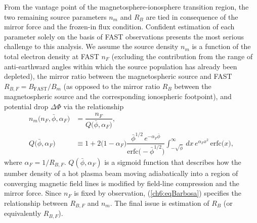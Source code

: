   From the vantage point of the magnetosphere-ionosphere transition region, the
  two remaining source parameters $n_m$ and $R_B$ are tied in consequence of
  the mirror force and the frozen-in flux condition. Confident estimation of
  each parameter solely on the basis of FAST observations presents the most
  serious challenge to this analysis. We assume the source density $n_m$ is a
  function of the total electron density at FAST $n_F$ (excluding the
  contribution from the range of anti-earthward angles within which the source
  population has already been depleted), the mirror ratio between the
  magnetospheric source and FAST $R_{B,F} = B_\textrm{FAST} / B_m$ (as opposed
  to the mirror ratio $R_B$ between the magnetospheric source and the
  corresponding ionospheric footpoint), and potential drop $\Delta \Phi$ via the
  relationship \citep{Barbosa1977}
  \begin{subequations}
    \begin{align} n_m \big ( n_F, \bar{\phi}, \alpha_F \big ) &= \dfrac{n_F}{Q \big ( \bar{\phi}, \alpha_F \big ) }, \label{ch6:eqnM} \\
      Q \big ( \bar{\phi}, \alpha_F \big ) &\equiv 1 + 2 \big ( 1 - \alpha_F
                                             \big ) \dfrac{ \bar{\phi}^{1/2} \,
                                             e^{- \alpha_F \bar{\phi}}
                                             }{\textrm{erfc} \big ( -
                                             \bar{\phi}^{1/2} \big )} {
                                             \displaystyle
                                             \int_{-\sqrt{\bar{\phi}}}^{\infty}
                                             } \, dx \, e^{\alpha_F x^2} \,
                                             \textrm{erfc} \big ( x \big
                                             ), \label{ch6:eqBarbosa}
    \end{align}
  \end{subequations}
  where \DIFdelbegin {}\DIFdelend $\alpha_F = 1 / R_{B,F}$. $Q (\bar{\phi}, \alpha_F)$ is a sigmoid
  function \citep[Figure 1b][]{Barbosa1977} that describes how the number
  density of a hot plasma beam moving adiabatically into a region of converging
  magnetic field lines is modified by field-line compression and the mirror
  force.  \DIFaddbegin {}\DIFaddend Since $n_F$ is fixed by observation, (\ref{ch6:eqBarbosa})
  specifies the relationship between $R_{B,F}$ and $n_m$. The final issue is
  estimation of $R_B$ (or equivalently $R_{B,F}$).

